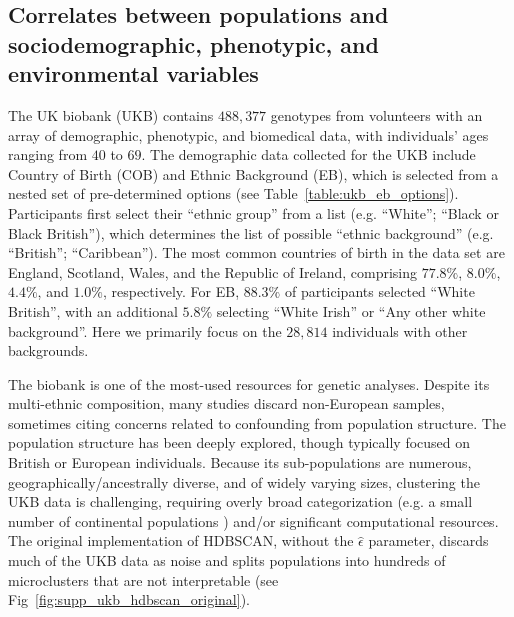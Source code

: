 \subsection{Correlates between populations and sociodemographic, phenotypic, and environmental variables}
The UK biobank (UKB) contains $488,377$ genotypes from volunteers with an array of demographic, phenotypic, and biomedical data, with individuals' ages ranging from $40$ to $69$. The demographic data collected for the UKB include Country of Birth (COB) and Ethnic Background (EB), which is selected from a nested set of pre-determined options (see Table~\ref{table:ukb_eb_options}). Participants first select their ``ethnic group'' from a list (e.g. ``White''; ``Black or Black British''), which determines the list of possible ``ethnic background'' (e.g. ``British''; ``Caribbean''). The most common countries of birth in the data set are England, Scotland, Wales, and the Republic of Ireland, comprising $77.8\%$, $8.0\%$, $4.4\%$, and $1.0\%$,  respectively. For EB, $88.3\%$ of participants selected ``White British'', with an additional $5.8\%$ selecting ``White Irish'' or ``Any other white background''. Here we primarily focus on the $28,814$ individuals with other backgrounds.

The biobank is one of the most-used resources for genetic analyses. Despite its multi-ethnic composition, many studies discard non-European samples, sometimes citing concerns related to confounding from population structure\citep{ben-eghan_dont_2020}. The population structure has been deeply explored, though typically focused on British or European individuals\citep{abdellaoui_genetic_2019,gilbert_revealing_2022,chiu_inferring_2022}. Because its sub-populations are numerous, geographically/ancestrally diverse, and of widely varying sizes, clustering the UKB data is challenging, requiring overly broad categorization (e.g. a small number of continental populations \citep{halldorsson_sequences_2022,nagar_socioeconomic_2021}) and/or significant computational resources. The original implementation of HDBSCAN, without the $\hat{\epsilon}$ parameter, discards much of the UKB data as noise and splits populations into hundreds of microclusters that are not interpretable (see Fig~\ref{fig:supp_ukb_hdbscan_original}).

\clearpage


